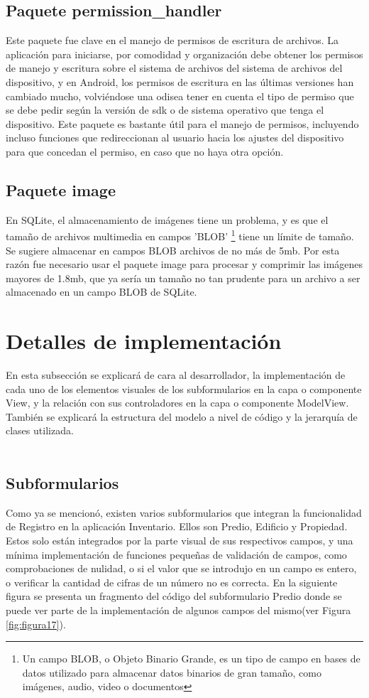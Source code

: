 \subsection{Paquete permission\_handler}
Este paquete fue clave en el manejo de permisos de escritura de archivos. La aplicación para iniciarse, por comodidad y organización debe obtener los permisos de manejo y escritura sobre el sistema de archivos
del sistema de archivos del dispositivo, y en Android, los permisos de escritura en las últimas versiones han cambiado mucho, volviéndose una odisea tener en cuenta el tipo de permiso que se debe pedir
según la versión de sdk o de sistema operativo que tenga el dispositivo. Este paquete es bastante útil para el manejo de permisos, incluyendo incluso funciones que redireccionan al usuario hacia los ajustes del
dispositivo para que concedan el permiso, en caso que no haya otra opción.
\subsection{Paquete image}
En SQLite, el almacenamiento de imágenes tiene un problema, y es que el tamaño de archivos multimedia en campos 'BLOB'
\footnote{Un campo BLOB, o Objeto Binario Grande, es un tipo de campo en bases de datos utilizado para almacenar datos binarios de gran tamaño, como imágenes, audio, video o documentos}
tiene un límite de tamaño. Se sugiere almacenar en campos BLOB archivos de no más de 5mb. Por esta razón fue necesario usar el paquete image\cite{image} para procesar y comprimir las imágenes mayores de 1.8mb, que ya sería un tamaño no tan prudente
para un archivo a ser almacenado en un campo BLOB de SQLite.
\section{Detalles de implementación}
En esta subsección se explicará de cara al desarrollador, la implementación de cada uno de los elementos visuales de los subformularios en la capa o componente View, y la relación con sus controladores en la capa o componente ModelView. También se explicará la estructura del
modelo a nivel de código y la jerarquía de clases utilizada.\\\\
\subsection{Subformularios}
Como ya se mencionó, existen varios subformularios que integran la funcionalidad de Registro en la aplicación Inventario. Ellos son Predio, Edificio y Propiedad. Estos solo están integrados por la parte visual de sus respectivos campos, y una mínima implementación
de funciones pequeñas de validación de campos, como comprobaciones de nulidad, o si el valor que se introdujo en un campo es entero, o verificar la cantidad de cifras de un número no es correcta. En la siguiente figura se presenta un fragmento del código del subformulario
Predio donde se puede ver parte de la implementación de algunos campos del mismo(ver Figura \ref{fig:figura17}).


